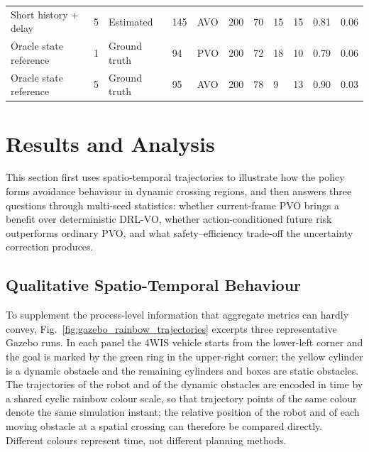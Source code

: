 \documentclass[10pt,a4paper,twocolumn]{article}
\begin{document}
\begin{table}[!t]
{\begin{tabular}{p{}p{}p{}p{}p{}p{}p{}p{}p{}p{}p{}}
        Short history + delay & 5 & Estimated & 145 & AVO & 200 & 70 & 15 & 15 & 0.81 & 0.06 \\
        Oracle state reference & 1 & Ground truth & 94 & PVO & 200 & 72 & 18 & 10 & 0.79 & 0.06 \\
        Oracle state reference & 5 & Ground truth & 95 & AVO & 200 & 78 & 9 & 13 & 0.90 & 0.03 \\
        \bottomrule
    \end{tabular}}
\end{table}

\section{Results and Analysis}

This section first uses spatio-temporal trajectories to illustrate how the policy forms avoidance behaviour in dynamic crossing regions, and then answers three questions through multi-seed statistics: whether current-frame PVO brings a benefit over deterministic DRL-VO, whether action-conditioned future risk outperforms ordinary PVO, and what safety--efficiency trade-off the uncertainty correction produces.

\subsection{Qualitative Spatio-Temporal Behaviour}

To supplement the process-level information that aggregate metrics can hardly convey, Fig.~\ref{fig:gazebo_rainbow_trajectories} excerpts three representative Gazebo runs. In each panel the 4WIS vehicle starts from the lower-left corner and the goal is marked by the green ring in the upper-right corner; the yellow cylinder is a dynamic obstacle and the remaining cylinders and boxes are static obstacles. The trajectories of the robot and of the dynamic obstacles are encoded in time by a shared cyclic rainbow colour scale, so that trajectory points of the same colour denote the same simulation instant; the relative position of the robot and of each moving obstacle at a spatial crossing can therefore be compared directly. Different colours represent time, not different planning methods.
\end{document}
